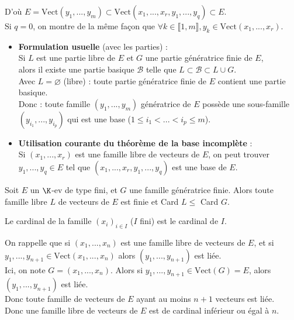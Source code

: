 \documentclass[12pt, a4paper]{report}
\begin{document}
\begin{demo}{}
\begin{itemize}
	D'où $E = \text{Vect}(y_1,...,y_m) \subset \text{Vect}(x_1,...,x_r,y_1,...,y_q) \subset E$. \\
	
	Si $q = 0$, on montre de la même façon que $\forall k \in \llbracket 1,m \rrbracket, y_k \in \text{Vect}(x_1,...,x_r)$. \\
\end{itemize}
\end{demo}

\begin{remarque}
\begin{itemize}
	\item \textbf{Formulation usuelle} (avec les parties) : \\
	Si $L$ est une partie libre de $E$ et $G$ une partie génératrice finie de $E$, \\
	alors il existe une partie basique $\mathcal{B}$ telle que $L \subset \mathcal{B} \subset L \cup G$. \\
	Avec $L=\varnothing$ (libre) : toute partie génératrice finie de $E$ contient une partie basique. \\
	Donc : toute famille $(y_1,...,y_m)$ génératrice de $E$ possède une sous-famille $(y_{i_1},...,y_{i_p})$ qui est une base ($1 \le i_1 < ... < i_p \le m$). \\
	
	\item \textbf{Utilisation courante du théorème de la base incomplète} : \\
	Si $(x_1,...,x_r)$ est une famille libre de vecteurs de $E$, on peut trouver $y_1,...,y_q \in E$ tel que $(x_1,...,x_r,y_1,...,y_q)$ est une base de $E$.
\end{itemize}
\end{remarque}

\begin{theoreme}{}{}
Soit $E$ un $\K$-ev de type fini, et $G$ une famille génératrice finie. Alors toute famille libre $L$ de vecteurs de $E$ est finie et Card $L \le$ Card $G$.
\end{theoreme}

\begin{remarque}[NB]{}
Le cardinal de la famille $(x_i)_{i \in I}$ ($I$ fini) est le cardinal de $I$.
\end{remarque}

\begin{demo}{}
On rappelle que si $(x_1,...,x_n)$ est une famille libre de vecteurs de $E$, et si $y_1,...,y_{n+1} \in \text{Vect}(x_1,...,x_n)$ alors $(y_1,...,y_{n+1})$ est liée. \\
Ici, on note $G = (x_1,...,x_n)$. Alors si $y_1,...,y_{n+1} \in \text{Vect}(G) = E$, alors $(y_1,...,y_{n+1})$ est liée. \\
Donc toute famille de vecteurs de $E$ ayant au moins $n+1$ vecteurs est liée. \\ Donc une famille libre de vecteurs de $E$ est de cardinal inférieur ou égal à $n$.
\end{demo}
\end{document}
